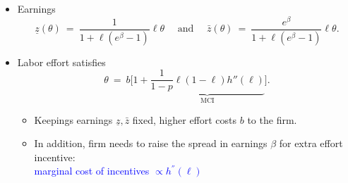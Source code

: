 \documentclass[11pt,a4paper]{article}
\begin{document}
\begin{itemize}
\item Earnings
\begin{equation}\label{eq:earnings-CRP}
  \underline{z}(\theta) \ = \ \frac{1}{1+\ell (e^\beta - 1)}\ell\theta \quad \text{ and }\quad \bar{z}(\theta) \ = \ \frac{e^\beta}{1+\ell (e^\beta - 1)}\ell\theta.
\end{equation}
\vspace{10pt}

\item Labor effort satisfies
\begin{equation}\label{eq:effort-CRP}
  \theta \ = \ b \Big[ 1 + \underbrace{\frac{1}{1-p} \ell (1-\ell) h''(\ell)}_{\text{MCI}} \Big].
\end{equation}
\begin{itemize}
\item Keepings earnings $\underline{z},\bar{z}$ fixed, higher effort costs $b$ to the firm. 
\item In addition,  firm needs to raise the spread in earnings $\beta$ for extra effort incentive: 
\\ \textcolor{blue}{marginal cost of incentives $\propto h^{''}(\ell)$}
\end{itemize}
\end{itemize}
\end{document}
